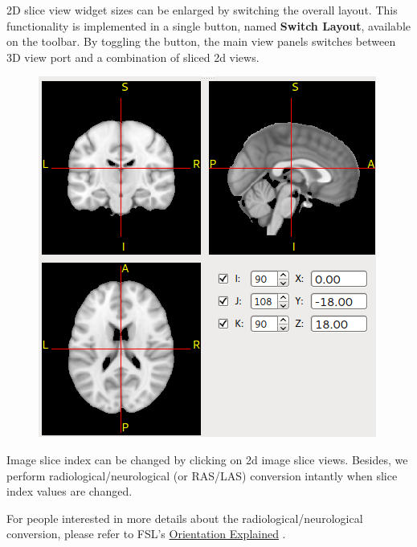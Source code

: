 \documentclass[letterpaper,10pt,english]{sphinxmanual}
\begin{document}
2D slice view widget sizes can be enlarged by switching the overall layout.
This functionality is implemented in a single button, named \textbf{Switch Layout},
available on the toolbar. By toggling the button, the main view panels switches
between 3D view port and a combination of sliced 2d views.
\begin{figure}[htbp]
\centering

\includegraphics{view_slices.png}
\end{figure}

Image slice index can be changed by clicking on 2d image slice views.
Besides, we perform radiological/neurological (or RAS/LAS) conversion intantly when slice index
values are changed.

For people interested in more details about the radiological/neurological conversion,
please refer to FSL's \href{http://fsl.fmrib.ox.ac.uk/fsl/fslwiki/Orientation\%20Explained}{Orientation Explained} .
\end{document}
